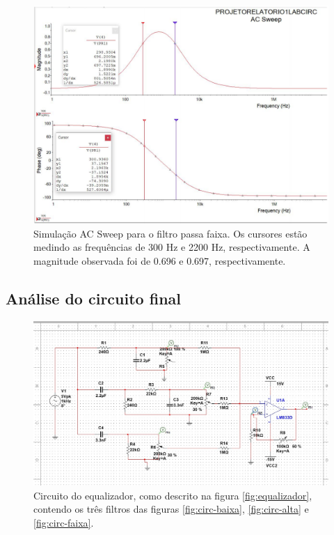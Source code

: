 \documentclass{article}
\begin{document}
\begin{figure}[ht!]
  \centering
  \includegraphics[width=.9\textwidth]{fig/ac-sweep-faixa.png}
  \caption{Simulação AC Sweep para o filtro passa faixa. Os cursores estão medindo as frequências de 300 Hz e 2200 Hz, respectivamente. A magnitude observada foi de 0.696 e 0.697, respectivamente.}
  \label{fig:ac-sweep-faixa}
\end{figure}

\subsection{Análise do circuito final}
\begin{figure}[ht!]
  \centering
  \includegraphics[width=\textwidth,trim={15mm 15mm 15mm 18mm},clip]{fig/circ-equalizador.jpeg}
  \caption{Circuito do equalizador, como descrito na figura \ref{fig:equalizador}, contendo os três filtros das figuras \ref{fig:circ-baixa}, \ref{fig:circ-alta} e \ref{fig:circ-faixa}.}
  \label{fig:circ-equalizador}
\end{figure}
\end{document}
